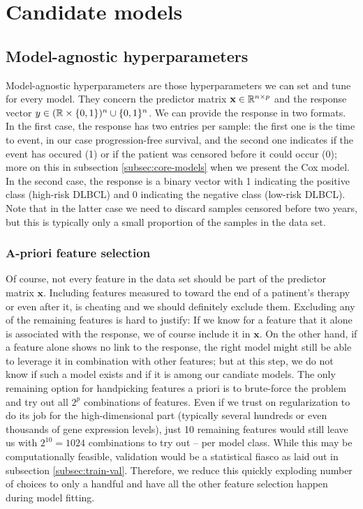 \section{Candidate models}\label{sec:candidate-models}

\subsection{Model-agnostic hyperparameters}\label{subsec:model-agnostic}

Model-agnostic hyperparameters are those hyperparameters we can set and tune for every model. They 
concern the predictor matrix $\mathbf{x} \in \mathbb{R}^{n \times p}$ and the response vector $y \in 
(\mathbb{R} \times \{ 0, 1 \})^n \cup \{ 0, 1 \}^n$. We can provide the response in two formats. In the 
first case, the response has two entries per sample: the first one is the time to event, in our 
case progression-free survival, and the second one indicates if the event has occured (1) or 
if the patient was censored before it could occur (0); more on this in subsection 
\ref{subsec:core-models} when we present the Cox model. In the second case, the response is a binary 
vector with 1 indicating the positive class (high-risk DLBCL)
and 0 indicating the negative class (low-risk DLBCL). Note that in the latter case we need 
to discard samples censored before two years, but this is typically only a small proportion of the 
samples in the data set.

\subsubsection{A-priori feature selection}

Of course, not every feature in the data set should be part of the predictor matrix $\mathbf{x}$. Including 
features measured to toward the end of a patinent's therapy or even after it, is cheating and we 
should definitely exclude them. Excluding any of the remaining features is hard to justify: If we 
know for a feature that it alone is associated with the response, we of course include it in $\mathbf{x}$.
On the other hand, if a feature alone shows no link to the response, the right model might still be 
able to leverage it in combination with other features; but at this step, we do not know if such 
a model exists and if it is among our candiate models. The only remaining option for handpicking 
features a priori is to brute-force the problem and try out all $2^p$ combinations of features.
Even if we trust on regularization to do its job for the high-dimensional part (typically several 
hundreds or even thousands of gene expression levels), just \num{10} remaining features would still
leave us with $2^{10} = 1024$ combinations to try out -- per model class. While this may be 
computationally feasible, validation would be a statistical fiasco as laid out in subsection 
\ref{subsec:train-val}. Therefore, we reduce this quickly exploding number of choices to only 
a handful and have all the other feature selection happen during model fitting. 

